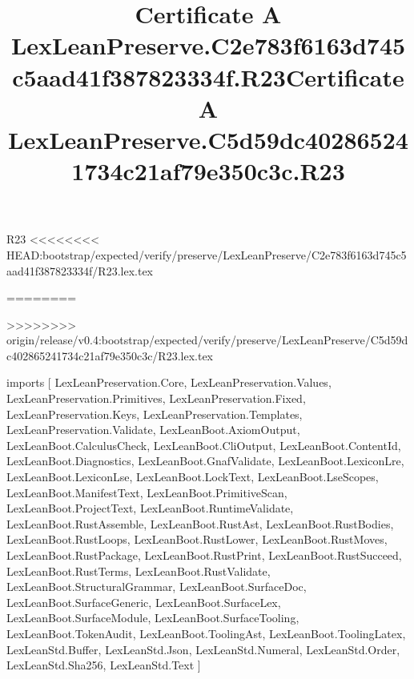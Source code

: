 \begin{lexlean}{R23}
<<<<<<<< HEAD:bootstrap/expected/verify/preserve/LexLeanPreserve/C2e783f6163d745c5aad41f387823334f/R23.lex.tex
\title{Certificate A LexLeanPreserve.C2e783f6163d745c5aad41f387823334f.R23}
========
\title{Certificate A LexLeanPreserve.C5d59dc402865241734c21af79e350c3c.R23}
>>>>>>>> origin/release/v0.4:bootstrap/expected/verify/preserve/LexLeanPreserve/C5d59dc402865241734c21af79e350c3c/R23.lex.tex
\begin{coremodule}
imports [
  LexLeanPreservation.Core,
  LexLeanPreservation.Values,
  LexLeanPreservation.Primitives,
  LexLeanPreservation.Fixed,
  LexLeanPreservation.Keys,
  LexLeanPreservation.Templates,
  LexLeanPreservation.Validate,
  LexLeanBoot.AxiomOutput,
  LexLeanBoot.CalculusCheck,
  LexLeanBoot.CliOutput,
  LexLeanBoot.ContentId,
  LexLeanBoot.Diagnostics,
  LexLeanBoot.GnafValidate,
  LexLeanBoot.LexiconLre,
  LexLeanBoot.LexiconLse,
  LexLeanBoot.LockText,
  LexLeanBoot.LseScopes,
  LexLeanBoot.ManifestText,
  LexLeanBoot.PrimitiveScan,
  LexLeanBoot.ProjectText,
  LexLeanBoot.RuntimeValidate,
  LexLeanBoot.RustAssemble,
  LexLeanBoot.RustAst,
  LexLeanBoot.RustBodies,
  LexLeanBoot.RustLoops,
  LexLeanBoot.RustLower,
  LexLeanBoot.RustMoves,
  LexLeanBoot.RustPackage,
  LexLeanBoot.RustPrint,
  LexLeanBoot.RustSucceed,
  LexLeanBoot.RustTerms,
  LexLeanBoot.RustValidate,
  LexLeanBoot.StructuralGrammar,
  LexLeanBoot.SurfaceDoc,
  LexLeanBoot.SurfaceGeneric,
  LexLeanBoot.SurfaceLex,
  LexLeanBoot.SurfaceModule,
  LexLeanBoot.SurfaceTooling,
  LexLeanBoot.TokenAudit,
  LexLeanBoot.ToolingAst,
  LexLeanBoot.ToolingLatex,
  LexLeanStd.Buffer,
  LexLeanStd.Json,
  LexLeanStd.Numeral,
  LexLeanStd.Order,
  LexLeanStd.Sha256,
  LexLeanStd.Text
]


\end{coremodule}
\end{lexlean}
